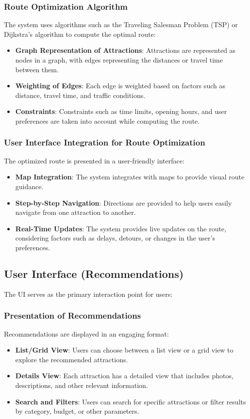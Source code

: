\subsubsection{Route Optimization Algorithm}
The system uses algorithms such as the Traveling Salesman Problem (TSP) or Dijkstra’s algorithm to compute the optimal route:
\begin{itemize}
    \item \textbf{Graph Representation of Attractions}: Attractions are represented as nodes in a graph, with edges representing the distances or travel time between them.
    \item \textbf{Weighting of Edges}: Each edge is weighted based on factors such as distance, travel time, and traffic conditions.
    \item \textbf{Constraints}: Constraints such as time limits, opening hours, and user preferences are taken into account while computing the route.
\end{itemize}

\subsubsection{User Interface Integration for Route Optimization}
The optimized route is presented in a user-friendly interface:
\begin{itemize}
    \item \textbf{Map Integration}: The system integrates with maps to provide visual route guidance.
    \item \textbf{Step-by-Step Navigation}: Directions are provided to help users easily navigate from one attraction to another.
    \item \textbf{Real-Time Updates}: The system provides live updates on the route, considering factors such as delays, detours, or changes in the user’s preferences.
\end{itemize}

\subsection{User Interface (Recommendations)}
The UI serves as the primary interaction point for users:
\subsubsection{Presentation of Recommendations}
Recommendations are displayed in an engaging format:
\begin{itemize}
    \item \textbf{List/Grid View}: Users can choose between a list view or a grid view to explore the recommended attractions.
    \item \textbf{Details View}: Each attraction has a detailed view that includes photos, descriptions, and other relevant information.
    \item \textbf{Search and Filters}: Users can search for specific attractions or filter results by category, budget, or other parameters.
\end{itemize}

